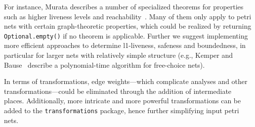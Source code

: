 For instance, Murata describes a number of specialized theorems for properties such as higher liveness levels and reachability~\cite{murata1989petri}. Many of them only apply to petri nets with certain graph-theoretic properties, which could be realized by returning \texttt{Optional.empty()} if no theorem is applicable. Further we suggest implementing more efficient approaches to determine l1-liveness, safeness and boundedness, in particular for larger nets with relatively simple structure (e.g., Kemper and Bause~\cite{kemper1992efficient} describe a polynomial-time algorithm for free-choice nets).

In terms of transformations, edge weights---which complicate analyses and other transformations---could be eliminated through the addition of intermediate places. Additionally, more intricate and more powerful transformations can be added to the \texttt{transformations} package, hence further simplifying input petri nets. 
